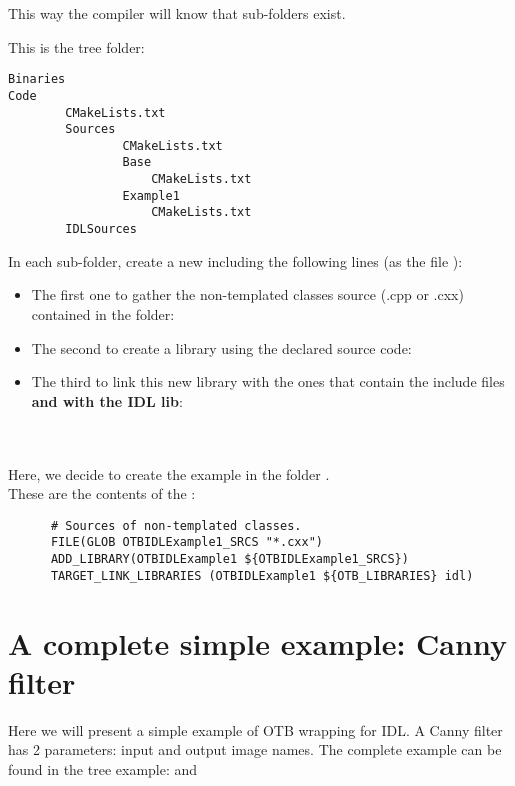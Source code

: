 This way the compiler will know that sub-folders exist.
 
This is the tree folder:
\begin{verbatim}
Binaries
Code
        CMakeLists.txt
        Sources
                CMakeLists.txt
                Base
                    CMakeLists.txt
                Example1
                    CMakeLists.txt
        IDLSources
\end{verbatim}
 
In each sub-folder, create a new  including the following lines (as the file ):
\begin{itemize}
\item The first one to gather the non-templated classes source (.cpp or .cxx) contained in the folder:\\ 
\item The second to create a library using the declared source code:\\
\item The third to link this new library with the ones that contain the include files \textbf{and with the IDL lib}:\\
\\ 
\end{itemize}

\\
      Here, we decide to create the example  in the folder .\\
      These are the contents of the :\\
\begin{verbatim}
      # Sources of non-templated classes.
      FILE(GLOB OTBIDLExample1_SRCS "*.cxx")
      ADD_LIBRARY(OTBIDLExample1 ${OTBIDLExample1_SRCS})
      TARGET_LINK_LIBRARIES (OTBIDLExample1 ${OTB_LIBRARIES} idl)
\end{verbatim}


\section{A complete simple example: Canny filter}
\label{canny}
Here we will present a simple example of OTB wrapping for IDL.
A Canny filter has 2 parameters: input and output image names.
The complete example can be found in the tree example:  and 

